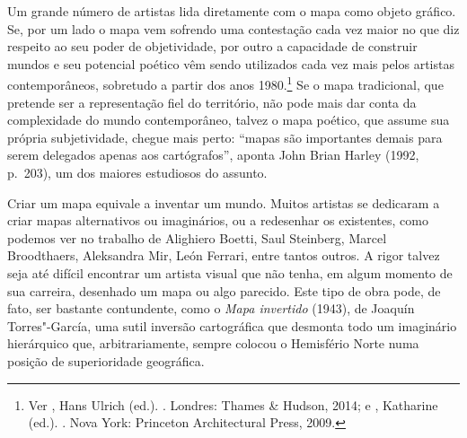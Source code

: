 Um grande número de artistas lida diretamente com o mapa como objeto
gráfico. Se, por um lado o mapa vem sofrendo uma contestação cada vez
maior no que diz respeito ao seu poder de objetividade, por outro a
capacidade de construir mundos e seu potencial poético vêm sendo
utilizados cada vez mais pelos artistas contemporâneos, sobretudo a
partir dos anos 1980.\footnote{Ver , Hans Ulrich
  (ed.). {}. Londres: Thames \& Hudson, 2014; e , Katharine
  (ed.). {}. Nova York: Princeton Architectural Press, 2009.} Se o mapa
tradicional, que pretende ser a representação fiel do território, não
pode mais dar conta da complexidade do mundo contemporâneo, talvez o
mapa poético, que assume sua própria subjetividade, chegue mais perto:
``mapas são importantes demais para serem delegados apenas aos
cartógrafos'', aponta John Brian Harley (1992, p.~203), um dos maiores
estudiosos do assunto.

Criar um mapa equivale a inventar um mundo. Muitos artistas se dedicaram
a criar mapas alternativos ou imaginários, ou a redesenhar os
existentes, como podemos ver no trabalho de Alighiero Boetti, Saul
Steinberg, Marcel Broodthaers, Aleksandra Mir, León Ferrari, entre
tantos outros. A rigor talvez seja até difícil encontrar um artista
visual que não tenha, em algum momento de sua carreira, desenhado um
mapa ou algo parecido. Este tipo de obra pode, de fato, ser bastante
contundente, como o \emph{Mapa invertido} (1943), de Joaquín
Torres"-García, uma sutil inversão cartográfica que desmonta todo um
imaginário hierárquico que, arbitrariamente, sempre colocou o Hemisfério
Norte numa posição de superioridade geográfica.


